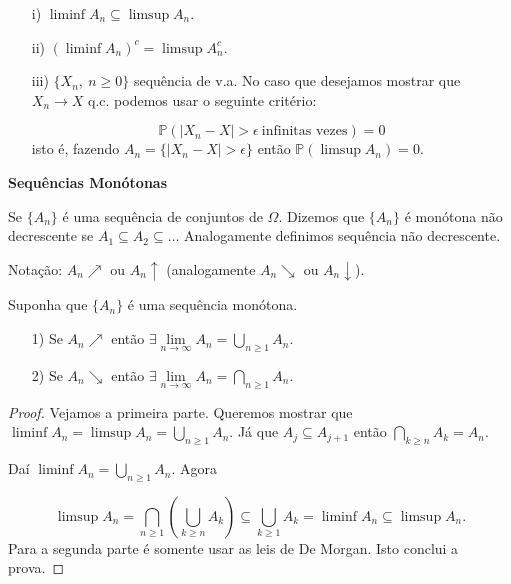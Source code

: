 \begin{observacao}

\begin{enumerate}
\item[i)] $\liminf A_n \subseteq \limsup A_n$.
\item[ii)] $\left( \liminf A_n \right)^c = \limsup A_n^c$. 
\item[iii)] $\{X_n,\ n\geqslant 0\}$ sequência de v.a. No caso que desejamos mostrar que $X_n \to X$ q.c.
podemos usar o seguinte critério:

$$
	\mathbb{P}( |X_n-X| > \epsilon \ \text{infinitas vezes} )=0
$$ 
isto é, fazendo $A_n= \{ |X_n-X|> \epsilon\}$ então $\mathbb{P} (\limsup A_n )=0$.
\end{enumerate}
\end{observacao}

\vspace*{1cm}
\textbf{Sequências Monótonas}

Se $\{A_n\}$ é uma sequência de conjuntos de $\Omega$. Dizemos que $\{A_n\}$ é monótona não
decrescente se $A_1 \subseteq A_2 \subseteq \ldots$ Analogamente definimos sequência não decrescente.

Notação: $A_n \nearrow$ ou $A_n \uparrow$ (analogamente $A_n\searrow$ ou $A_n \downarrow$).

\begin{proposicao}
 Suponha que $\{A_n\}$ é uma sequência monótona.
 \begin{enumerate}
 \item[1)] Se $A_n \nearrow$ então 
 	$\exists \lim \limits_{n \to \infty} A_n= \displaystyle\bigcup_{n\geqslant 1} {A_n}$.
 \item[2)] Se $A_n \searrow$ então 
 	$\exists \lim \limits_{n \to \infty} A_n= \displaystyle\bigcap_{n\geqslant 1} {A_n}$.
 \end{enumerate}
\end{proposicao}


\begin{proof}
Vejamos a primeira parte. Queremos mostrar que 
$\liminf A_n = \limsup A_n =\displaystyle\bigcup_{n\geqslant 1} {A_n}$. Já que $A_j \subseteq A_{j+1}$
então $\displaystyle\bigcap_{k\geqslant n} {A_k}=A_n$.

Daí $\liminf A_n = \displaystyle\bigcup_{n\geqslant 1} {A_n}$. Agora 

$$
	\limsup A_n 
	=
	\displaystyle\bigcap_{n\geqslant 1} \left(\displaystyle\bigcup_{k\geqslant n}{A_k} \right)
	\subseteq 
	\displaystyle\bigcup_{k\geqslant 1} {A_k} 
	=
	\liminf A_n \subseteq \limsup A_n.
$$
Para a segunda parte é somente usar as leis de De Morgan. Isto conclui a prova.
\end{proof}

